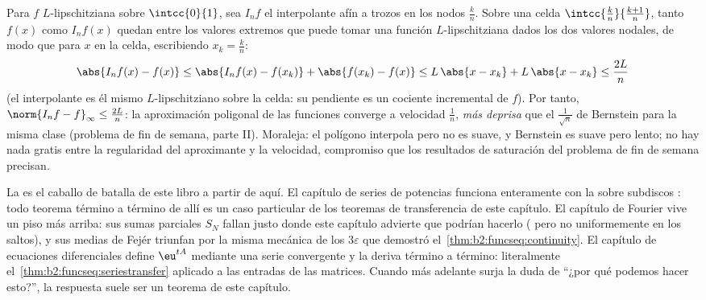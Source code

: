 \begin{example}\label{ex:b2:funcseq:polygonal}
Para $f$ $L$-lipschitziana sobre $\intcc{0}{1}$, sea $I_nf$ el
interpolante afín a trozos en los nodos $\frac kn$. Sobre una celda
$\intcc{\frac kn}{\frac{k+1}n}$, tanto $f(x)$ como $I_nf(x)$ quedan
entre los valores extremos que puede tomar una función
$L$-lipschitziana dados los dos valores nodales, de modo que para
$x$ en la celda, escribiendo $x_k = \frac kn$:
\[
\abs{I_nf(x) - f(x)}
\leq \abs{I_nf(x) - f(x_k)} + \abs{f(x_k) - f(x)}
\leq L\,\abs{x - x_k} + L\,\abs{x - x_k}
\leq \frac{2L}{n}
\]
(el interpolante es él mismo $L$-lipschitziano sobre la celda: su
pendiente es un cociente incremental de $f$). Por tanto,
$\norm{I_nf - f}_\infty \leq \frac{2L}{n}$: la aproximación poligonal
de las funciones  converge a velocidad $\frac1n$,
\emph{más deprisa} que el $\frac{1}{\sqrt n}$ de Bernstein para la
misma clase (problema de fin de semana, parte II). Moraleja: el
polígono interpola pero no es suave, y Bernstein es suave pero
lento; no hay nada gratis entre la regularidad del aproximante y la
velocidad, compromiso que los resultados de saturación del problema
de fin de semana precisan.
\end{example}

\begin{remark}
La  es el caballo de batalla de este libro a
partir de aquí. El capítulo de series de potencias funciona
enteramente con la  sobre subdiscos :
todo teorema término a término de allí es un caso particular de los
teoremas de transferencia de este capítulo. El capítulo de Fourier
vive un piso más arriba: sus sumas parciales $S_N$ fallan justo donde
este capítulo advierte que podrían hacerlo ( pero no
uniformemente en los saltos), y sus medias de Fejér triunfan por la
misma mecánica de los $3\varepsilon$ que demostró el~\cref{thm:b2:funcseq:continuity}. El capítulo de ecuaciones
diferenciales define $\eu^{tA}$ mediante una serie 
convergente y la deriva término a término: literalmente el~\cref{thm:b2:funcseq:seriestransfer} aplicado a las entradas de las
matrices. Cuando más adelante surja la duda de ``¿por qué podemos
hacer esto?'', la respuesta suele ser un teorema de este capítulo.
\end{remark}

